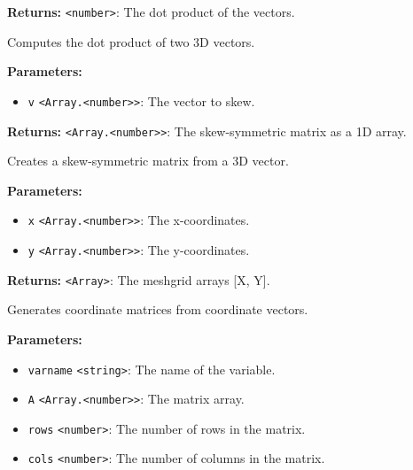 \documentclass[12pt,a4paper]{article}
\begin{document}
\noindent \textbf{Returns:} \texttt{<number>}: The dot product of the vectors.

\noindent Computes the dot product of two 3D vectors.

\vspace{5mm}
\noindent {}


\noindent \textbf{Parameters:}
\begin{itemize}
  \item \texttt{v} \texttt{<Array.<number>>}: The vector to skew.
\end{itemize}

\noindent \textbf{Returns:} \texttt{<Array.<number>>}: The skew-symmetric matrix as a 1D array.

\noindent Creates a skew-symmetric matrix from a 3D vector.

\vspace{5mm}
\noindent {}


\noindent \textbf{Parameters:}
\begin{itemize}
  \item \texttt{x} \texttt{<Array.<number>>}: The x-coordinates.
  \item \texttt{y} \texttt{<Array.<number>>}: The y-coordinates.
\end{itemize}

\noindent \textbf{Returns:} \texttt{<Array>}: The meshgrid arrays [X, Y].

\noindent Generates coordinate matrices from coordinate vectors.

\vspace{5mm}
\noindent {}


\noindent \textbf{Parameters:}
\begin{itemize}
  \item \texttt{varname} \texttt{<string>}: The name of the variable.
  \item \texttt{A} \texttt{<Array.<number>>}: The matrix array.
  \item \texttt{rows} \texttt{<number>}: The number of rows in the matrix.
  \item \texttt{cols} \texttt{<number>}: The number of columns in the matrix.
\end{itemize}
\end{document}
